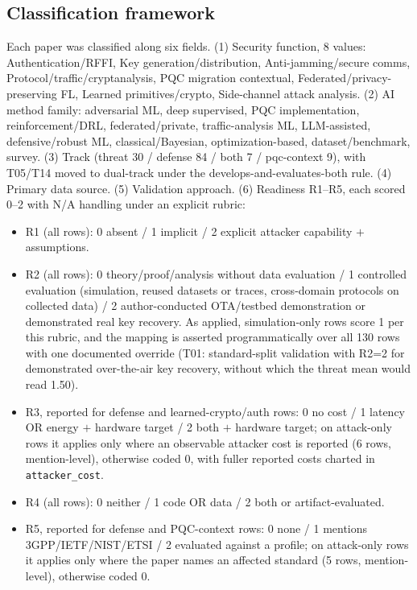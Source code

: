 \subsection{Classification framework}
Each paper was classified along six fields. (1) Security function, 8 values: Authentication/RFFI, Key generation/distribution, Anti-jamming/secure comms, Protocol/traffic/cryptanalysis, PQC migration contextual, Federated/privacy-preserving FL, Learned primitives/crypto, Side-channel attack analysis. (2) AI method family: adversarial ML, deep supervised, PQC implementation, reinforcement/DRL, federated/private, traffic-analysis ML, LLM-assisted, defensive/robust ML, classical/Bayesian, optimization-based, dataset/benchmark, survey. (3) Track (threat 30 / defense 84 / both 7 / pqc-context 9), with T05/T14 moved to dual-track under the develops-and-evaluates-both rule. (4) Primary data source. (5) Validation approach. (6) Readiness R1--R5, each scored 0--2 with N/A handling under an explicit rubric:
\begin{itemize}\setlength\itemsep{1pt}
\item R1 (all rows): 0 absent / 1 implicit / 2 explicit attacker capability $+$ assumptions.
\item R2 (all rows): 0 theory/proof/analysis without data evaluation / 1 controlled evaluation (simulation, reused datasets or traces, cross-domain protocols on collected data) / 2 author-conducted OTA/testbed demonstration or demonstrated real key recovery. As applied, simulation-only rows score 1 per this rubric, and the mapping is asserted programmatically over all 130 rows with one documented override (T01: standard-split validation with R2=2 for demonstrated over-the-air key recovery, without which the threat mean would read 1.50).
\item R3, reported for defense and learned-crypto/auth rows: 0 no cost / 1 latency OR energy $+$ hardware target / 2 both $+$ hardware target; on attack-only rows it applies only where an observable attacker cost is reported (6 rows, mention-level), otherwise coded 0, with fuller reported costs charted in \texttt{attacker\_cost}.
\item R4 (all rows): 0 neither / 1 code OR data / 2 both or artifact-evaluated.
\item R5, reported for defense and PQC-context rows: 0 none / 1 mentions 3GPP/IETF/NIST/ETSI / 2 evaluated against a profile; on attack-only rows it applies only where the paper names an affected standard (5 rows, mention-level), otherwise coded 0.
\end{itemize}

